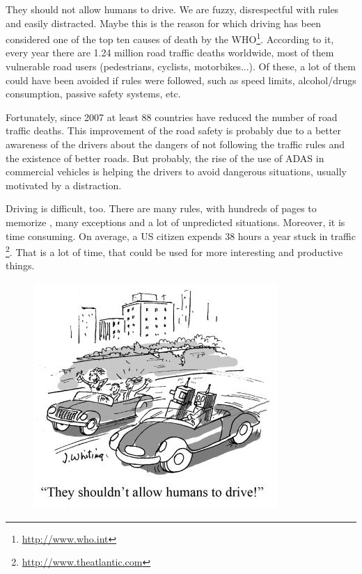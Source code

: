 
\graphicspath{{./images/chapter00/bmps/}{./images/chapter00/vects/}{./images/chapter00/}}

\label{ch:chapter00}


They should not allow humans to drive. We are fuzzy, disrespectful with rules and easily distracted. Maybe this is the reason for which driving has been considered one of the top ten causes of death by the \ac{WHO}\footnote{\href{http://www.who.int/features/factfiles/roadsafety/en/}{http://www.who.int}}. According to it, every year there are 1.24 million road traffic deaths worldwide, most of them vulnerable road users (pedestrians, cyclists, motorbikes...). Of these, a lot of them could have been avoided if rules were followed, such as speed limits, alcohol/drugs consumption, passive safety systems, etc. 

Fortunately, since 2007 at least 88 countries have reduced the number of road traffic deaths. This improvement of the road safety is probably due to a better awareness of the drivers about the dangers of not following the traffic rules and the existence of better roads. But probably, the rise of the use of \ac{ADAS} in commercial vehicles is helping the drivers to avoid dangerous situations, usually motivated by a distraction.

Driving is difficult, too. There are many rules, with hundreds of pages to memorize \citep{schwarzenegger2007california}, many exceptions and a lot of unpredicted situations. Moreover, it is time consuming. On average, a US citizen expends 38 hours a year stuck in traffic \footnote{\href{http://www.theatlantic.com/business/archive/2013/02/the-american-commuter-spends-38-hours-a-year-stuck-in-traffic/272905}{http://www.theatlantic.com}}. That is a lot of time, that could be used for more interesting and productive things.

\begin{figure}
  \centering
  \includegraphics{CarCartoon}
\end{figure}

